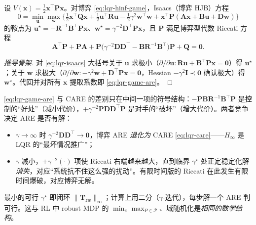 \begin{theorem}\label{thm:lqr-game-are}
设 $V(\mathbf x)=\tfrac12\mathbf x^\top\mathbf P\mathbf x$。对博弈 \cref{eq:lqr-hinf-game}，Isaacs（博弈 HJB）方程
\begin{equation}
  0=\min_{\mathbf u}\max_{\mathbf w}\Big\{\tfrac12\mathbf x^\top\mathbf Q\mathbf x+\tfrac12\mathbf u^\top\mathbf R\mathbf u-\tfrac12\gamma^2\mathbf w^\top\mathbf w+\mathbf x^\top\mathbf P(\mathbf A\mathbf x+\mathbf B\mathbf u+\mathbf D\mathbf w)\Big\}
  \label{eq:lqr-isaacs}
\end{equation}
的鞍点为 $\mathbf u^\star=-\mathbf R^{-1}\mathbf B^\top\mathbf P\mathbf x$、$\mathbf w^\star=\gamma^{-2}\mathbf D^\top\mathbf P\mathbf x$，且 $\mathbf P$ 满足博弈型代数 Riccati 方程
\begin{equation}
  \mathbf A^\top\mathbf P+\mathbf P\mathbf A+\mathbf P\big(\gamma^{-2}\mathbf D\mathbf D^\top-\mathbf B\mathbf R^{-1}\mathbf B^\top\big)\mathbf P+\mathbf Q=\mathbf0.
  \label{eq:lqr-game-are}
\end{equation}
\end{theorem}

\begin{proof}[推导骨架]
对 \cref{eq:lqr-isaacs} 大括号关于 $\mathbf u$ 求极小（$\partial/\partial\mathbf u:\mathbf R\mathbf u+\mathbf B^\top\mathbf P\mathbf x=\mathbf0$）得 $\mathbf u^\star$；关于 $\mathbf w$ 求极大（$\partial/\partial\mathbf w:-\gamma^2\mathbf w+\mathbf D^\top\mathbf P\mathbf x=\mathbf0$，Hessian $-\gamma^2\mathbf I\prec\mathbf0$ 确认极大）得 $\mathbf w^\star$。代回并对所有 $\mathbf x$ 提取系数即 \cref{eq:lqr-game-are}。
\end{proof}

\begin{insight}
\cref{eq:lqr-game-are} 与 CARE 的差别只在中间一项的符号结构：$-\mathbf P\mathbf B\mathbf R^{-1}\mathbf B^\top\mathbf P$ 是控制的“好处”（减小代价），$+\gamma^{-2}\mathbf P\mathbf D\mathbf D^\top\mathbf P$ 是对手的“破坏”（增大代价）。两者竞争决定 ARE 是否有解：
\begin{itemize}
  \item $\gamma\to\infty$ 时 $\gamma^{-2}\mathbf D\mathbf D^\top\to\mathbf0$，博弈 ARE \emph{退化为} CARE \cref{eq:lqr-care}——$H_\infty$ 是 LQR 的“最坏情况推广”；
  \item $\gamma$ 减小，$+\gamma^{-2}(\cdot)$ 项使 Riccati 右端越来越大，直到临界 $\gamma^\star$ 处正定稳定化解\emph{消失}，对应“系统抗不住这么强的扰动”。有限时间版的 Riccati 在此发生有限时间爆破，对应博弈无解。
\end{itemize}
最小的可行 $\gamma^\star$ 即闭环 $\|\mathbf T_{zw}\|_\infty$；计算上用二分（$\gamma$-迭代），每步解一个 ARE 判可行。这与 RL 中 robust MDP 的 $\min_\pi\max_{P\in\mathcal P}$、域随机化是\emph{相同的数学结构}。
\end{insight}

